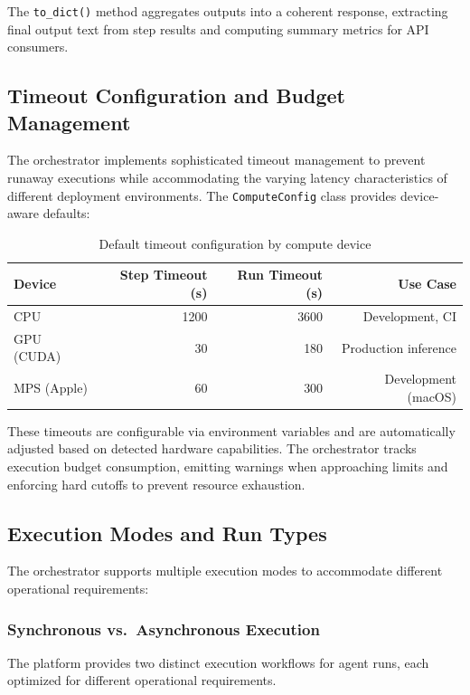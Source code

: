 \documentclass[a4paper,twoside]{sapthesis}
\begin{document}
The \texttt{to\_dict()} method aggregates outputs into a coherent response, extracting final output text from step results and computing summary metrics for API consumers.

\subsection{Timeout Configuration and Budget Management}

The orchestrator implements sophisticated timeout management to prevent runaway executions while accommodating the varying latency characteristics of different deployment environments. The \texttt{ComputeConfig} class provides device-aware defaults:

\begin{table}[htbp]
\centering
\caption{Default timeout configuration by compute device}
\label{tab:timeout-config}
\begin{tabular}{lrrr}
\hline
\textbf{Device} & \textbf{Step Timeout (s)} & \textbf{Run Timeout (s)} & \textbf{Use Case} \\
\midrule
CPU & 1200 & 3600 & Development, CI \\
GPU (CUDA) & 30 & 180 & Production inference \\
MPS (Apple) & 60 & 300 & Development (macOS) \\
\midrule
\end{tabular}
\end{table}

These timeouts are configurable via environment variables and are automatically adjusted based on detected hardware capabilities. The orchestrator tracks execution budget consumption, emitting warnings when approaching limits and enforcing hard cutoffs to prevent resource exhaustion.

\subsection{Execution Modes and Run Types}
\label{subsec:execution-modes}

The orchestrator supports multiple execution modes to accommodate different operational requirements:

\subsubsection{Synchronous vs.\ Asynchronous Execution}

The platform provides two distinct execution workflows for agent runs, each optimized for different operational requirements.
\end{document}
